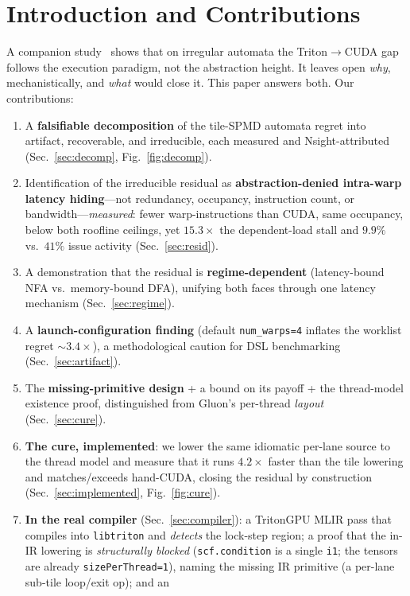 \documentclass[conference]{IEEEtran}
\begin{document}
\section{Introduction and Contributions}
A companion study~\cite{paper1} shows that on irregular automata the Triton$\rightarrow$CUDA gap
follows the execution paradigm, not the abstraction height. It leaves open \emph{why}, mechanistically,
and \emph{what} would close it. This paper answers both. Our contributions:
\begin{enumerate}
\item A \textbf{falsifiable decomposition} of the tile-SPMD automata regret into artifact, recoverable,
and irreducible, each measured and Nsight-attributed (Sec.~\ref{sec:decomp}, Fig.~\ref{fig:decomp}).
\item Identification of the irreducible residual as \textbf{abstraction-denied intra-warp latency
hiding}---not redundancy, occupancy, instruction count, or bandwidth---\emph{measured}: fewer
warp-instructions than CUDA, same occupancy, below both roofline ceilings, yet $15.3\times$ the
dependent-load stall and $9.9\%$ vs.\ $41\%$ issue activity (Sec.~\ref{sec:resid}).
\item A demonstration that the residual is \textbf{regime-dependent} (latency-bound NFA vs.\
memory-bound DFA), unifying both faces through one latency mechanism (Sec.~\ref{sec:regime}).
\item A \textbf{launch-configuration finding} (default \texttt{num\_warps=4} inflates the worklist
regret ${\sim}3.4\times$), a methodological caution for DSL benchmarking (Sec.~\ref{sec:artifact}).
\item The \textbf{missing-primitive design} + a bound on its payoff + the thread-model existence proof,
distinguished from Gluon's per-thread \emph{layout} (Sec.~\ref{sec:cure}).
\item \textbf{The cure, implemented}: we lower the same idiomatic per-lane source to the thread model
and measure that it runs $4.2\times$ faster than the tile lowering and matches/exceeds hand-CUDA,
closing the residual by construction (Sec.~\ref{sec:implemented}, Fig.~\ref{fig:cure}).
\item \textbf{In the real compiler} (Sec.~\ref{sec:compiler}): a TritonGPU MLIR pass that compiles into
\texttt{libtriton} and \emph{detects} the lock-step region; a proof that the in-IR lowering is
\emph{structurally blocked} (\texttt{scf.condition} is a single \texttt{i1}; the tensors are already
\texttt{sizePerThread=1}), naming the missing IR primitive (a per-lane sub-tile loop/exit op); and an

\end{enumerate}
\end{document}
